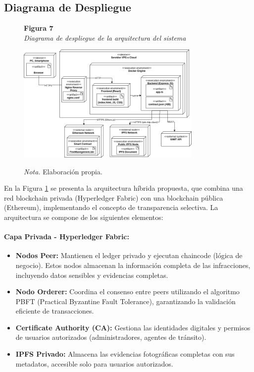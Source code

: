 \subsection{ Diagrama de Despliegue }
\begin{figure}[htbp]
    \begin{flushleft}
        \textbf{Figura 7}\\[2em]
        \textit{Diagrama de despliegue de la arquitectura del sistema}
    \end{flushleft}
    \vspace{1em}
    \centering
    \includegraphics[width=0.8\textwidth]{Images/Despliegue.png}
    \vspace{2em}
    \begin{flushleft}
        \textit{Nota.} Elaboración propia.
    \end{flushleft}
    \label{fig:diagrama_despliegue}
\end{figure}

En la Figura \ref{fig:diagrama_despliegue} se presenta la arquitectura híbrida propuesta, que combina una red blockchain privada (Hyperledger Fabric) con una blockchain pública (Ethereum), implementando el concepto de transparencia selectiva. La arquitectura se compone de los siguientes elementos:

\paragraph{Capa Privada - Hyperledger Fabric:}
\begin{itemize}
    \item \textbf{Nodos Peer:} Mantienen el ledger privado y ejecutan chaincode (lógica de negocio). Estos nodos almacenan la información completa de las infracciones, incluyendo datos sensibles y evidencias completas.
    \item \textbf{Nodo Orderer:} Coordina el consenso entre peers utilizando el algoritmo PBFT (Practical Byzantine Fault Tolerance), garantizando la validación eficiente de transacciones.
    \item \textbf{Certificate Authority (CA):} Gestiona las identidades digitales y permisos de usuarios autorizados (administradores, agentes de tránsito).
    \item \textbf{IPFS Privado:} Almacena las evidencias fotográficas completas con sus metadatos, accesible solo para usuarios autorizados.
\end{itemize}

